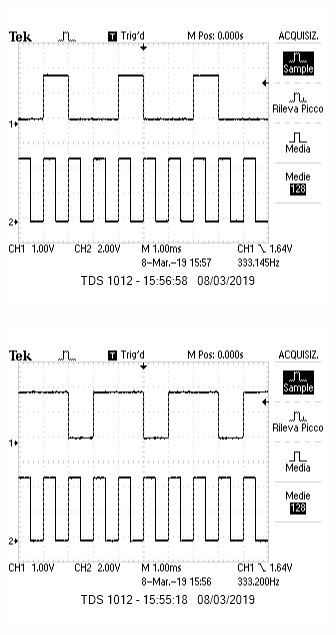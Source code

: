 \documentclass{article}
\begin{document}
		\begin{minipage}{.45\linewidth}
			\centering
			\includegraphics[width=\linewidth]{foto/uscita_giallo}
			\label{fig:uscitagiallo}
		\end{minipage}
		\begin{minipage}{0.1\linewidth}
			
		\end{minipage}
		\begin{minipage}{.45\linewidth}
			\centering
			\includegraphics[width=\linewidth]{foto/uscita_verde}
			\label{fig:uscitaverde}
		\end{minipage}
\end{document}
